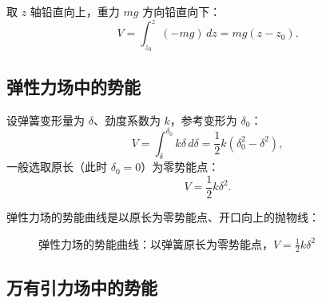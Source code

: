 取 $z$ 轴铅直向上，重力 $mg$ 方向铅直向下：
\begin{equation}\label{eq:13-V-weight}
  V=\int_{z_0}^{z}(-mg)\,dz=mg\left(z-z_0\right).
\end{equation}

\subsection{弹性力场中的势能}

设弹簧变形量为 $\delta$、劲度系数为 $k$，参考变形为 $\delta_0$：
\begin{equation}\label{eq:13-V-elastic-int}
  V=\int_{\delta}^{\delta_0}k\delta\,d\delta=\frac{1}{2}k\left(\delta_0^2-\delta^2\right),
\end{equation}
一般选取原长（此时 $\delta_0=0$）为零势能点：
\begin{equation}\label{eq:13-V-elastic}
  V=\frac{1}{2}k\delta^2 .
\end{equation}

弹性力场的势能曲线是以原长为零势能点、开口向上的抛物线：
\begin{figure}[H]
    \centering
    \caption{弹性力场的势能曲线：以弹簧原长为零势能点，$V=\frac{1}{2}k\delta^2$}
    \label{fig:13-V-elastic}
\end{figure}

\subsection{万有引力场中的势能}

